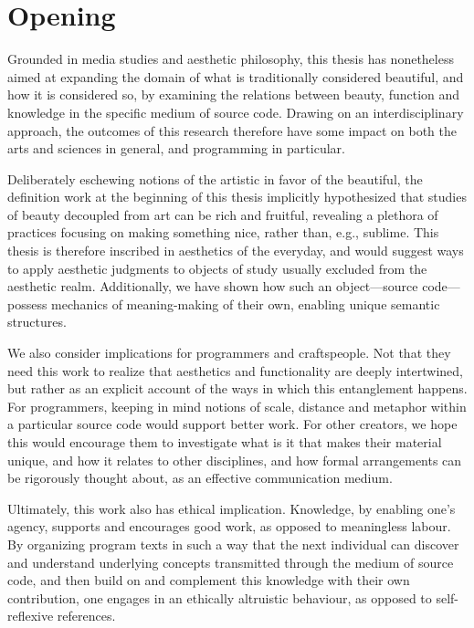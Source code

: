 \section{Opening}
\label{sec:opening}

Grounded in media studies and aesthetic philosophy, this thesis has nonetheless aimed at expanding the domain of what is traditionally considered beautiful, and how it is considered so, by examining the relations between beauty, function and knowledge in the specific medium of source code. Drawing on an interdisciplinary approach, the outcomes of this research therefore have some impact  on both the arts and sciences in general, and programming in particular.

Deliberately eschewing notions of the artistic in favor of the beautiful, the definition work at the beginning of this thesis implicitly hypothesized that studies of beauty decoupled from art can be rich and fruitful, revealing a plethora of practices focusing on making something nice, rather than, e.g., sublime. This thesis is therefore inscribed in aesthetics of the everyday, and would suggest ways to apply aesthetic judgments to objects of study usually excluded from the aesthetic realm. Additionally, we have shown how such an object—source code—possess mechanics of meaning-making of their own, enabling unique semantic structures.

We also consider implications for programmers and craftspeople. Not that they need this work to realize that aesthetics and functionality are deeply intertwined, but rather as an explicit account of the ways in which this entanglement happens. For programmers, keeping in mind notions of scale, distance and metaphor within a particular source code would support better work. For other creators, we hope this would encourage them to investigate what is it that makes their material unique, and how it relates to other disciplines, and how formal arrangements  can be rigorously thought about, as an effective communication medium.

Ultimately, this work also has ethical implication. Knowledge, by enabling one's agency, supports and encourages good work, as opposed to meaningless labour. By organizing program texts in such a way that the next individual can discover and understand underlying concepts transmitted through the medium of source code, and then build on and complement this knowledge with their own contribution, one engages in an ethically altruistic behaviour, as opposed to self-reflexive references.

